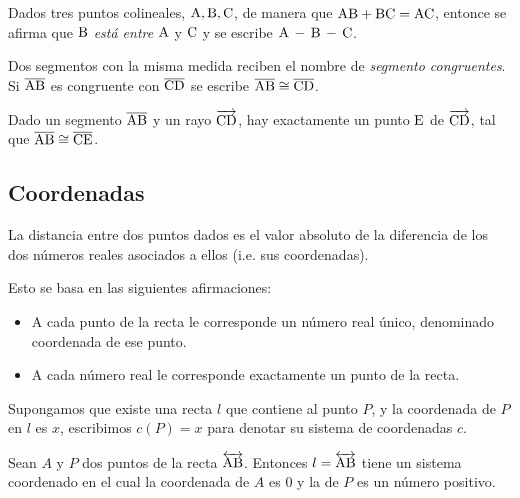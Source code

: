 \begin{definition}
    Dados tres puntos colineales, $\rm A,B,C$, de manera que $\rm AB + \rm BC = \rm AC$, entonce se afirma que $\rm B$ \textit{está entre} $\rm A$ y $\rm C$ y se escribe $\rm A \,- \,B \,- \, C$.
\end{definition}

\begin{definition}
    Dos segmentos con la misma medida reciben el nombre de \textit{segmento congruentes}. Si $\overline{\rm AB}$ es congruente con $\overline{\rm CD}$ se escribe $\overline{\rm AB} \cong \overline{\rm CD}$.
\end{definition}

\begin{theorem}
    Dado un segmento $\overline{\rm AB}$ y un rayo $\overrightarrow{\rm CD}$, hay exactamente un punto $\rm E$ de $\overrightarrow{\rm CD}$, tal que $\overline{\rm AB} \cong \overline{\rm CE}$.   

\end{theorem}

\clearpage

\subsection{Coordenadas}

\begin{postulate}
    La distancia entre dos puntos dados es el valor absoluto de la diferencia de los dos números reales asociados a ellos (i.e. sus coordenadas).

    Esto se basa en las siguientes afirmaciones:
    
    \begin{itemize}
        \item A cada punto de la recta le corresponde un número real único, denominado coordenada de ese punto.
        \item A cada número real le corresponde exactamente un punto de la recta.    
    \end{itemize}

    Supongamos que existe una recta $l$ que contiene al punto $P$, y la coordenada de $P$ en $l$ es $x$, escribimos $c(P) = x$ para denotar su sistema de coordenadas $c$.
    
\end{postulate}

\begin{theorem}
    Sean $A$ y $P$ dos puntos de la recta $\overleftrightarrow{\rm AB}$. Entonces $l = \overleftrightarrow{\rm AB}$ tiene un sistema coordenado en el cual la coordenada de $A$ es $0$ y la de $P$ es un número positivo.

    \begin{figure}[!h]
        \centering
        
        \label{fig:postulate18}
    \end{figure}

\end{theorem}

